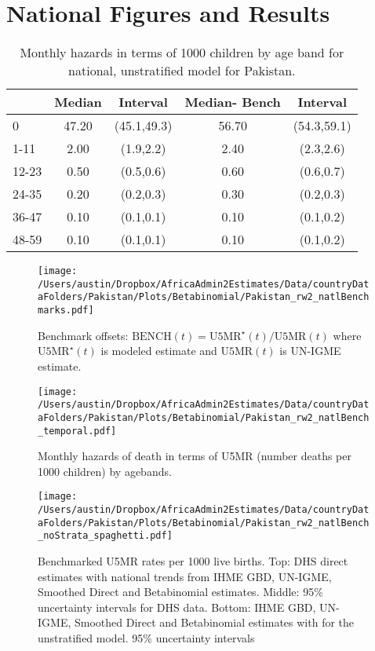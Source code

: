 \documentclass[]{article}
\begin{document}


\hypertarget{national-figures-and-results}{%
\section{National Figures and
Results}\label{national-figures-and-results}}

\begin{table}[ht]
\centering
\begin{tabular}{l|cc|cc}
  \hline
 & Median & Interval & Median- Bench & Interval \\ 
  \hline
0 & 47.20 & (45.1,49.3) & 56.70 & (54.3,59.1) \\ 
  1-11 & 2.00 & (1.9,2.2) & 2.40 & (2.3,2.6) \\ 
  12-23 & 0.50 & (0.5,0.6) & 0.60 & (0.6,0.7) \\ 
  24-35 & 0.20 & (0.2,0.3) & 0.30 & (0.2,0.3) \\ 
  36-47 & 0.10 & (0.1,0.1) & 0.10 & (0.1,0.2) \\ 
  48-59 & 0.10 & (0.1,0.1) & 0.10 & (0.1,0.2) \\ 
   \hline
\end{tabular}
\caption{Monthly hazards in terms of 1000 children by age band for national, unstratified model for Pakistan.} 
\end{table}

\begin{figure}
    \centering
    \texttt{[image: /Users/austin/Dropbox/AfricaAdmin2Estimates/Data/countryDataFolders/Pakistan/Plots/Betabinomial/Pakistan\_rw2\_natlBenchmarks.pdf]}
    \caption{Benchmark offsets: $
\mbox{BENCH}(t) = \mbox{U5MR}^\star(t)/\mbox{U5MR}(t)$ 
 where $\mbox{U5MR}^\star(t)$ is modeled estimate and  $\mbox{U5MR}(t)
$ is UN-IGME estimate.}
\end{figure}

\begin{figure}
    \centering
    \texttt{[image: /Users/austin/Dropbox/AfricaAdmin2Estimates/Data/countryDataFolders/Pakistan/Plots/Betabinomial/Pakistan\_rw2\_natlBench\_temporal.pdf]}
    \caption{Monthly hazards of death in terms of U5MR (number deaths per 1000 children) by agebands.}
\end{figure}
\clearpage

\begin{figure}
    \centering
    \texttt{[image: /Users/austin/Dropbox/AfricaAdmin2Estimates/Data/countryDataFolders/Pakistan/Plots/Betabinomial/Pakistan\_rw2\_natlBench\_noStrata\_spaghetti.pdf]}
    \caption{Benchmarked U5MR rates per 1000 live births. Top: DHS direct estimates with national trends from IHME GBD, UN-IGME, Smoothed Direct and Betabinomial estimates. Middle: 95\% uncertainty intervals for DHS data. Bottom: IHME GBD, UN-IGME, Smoothed Direct and Betabinomial estimates with for the unstratified model. 95\% uncertainty intervals}
\end{figure}
\clearpage
\end{document}
